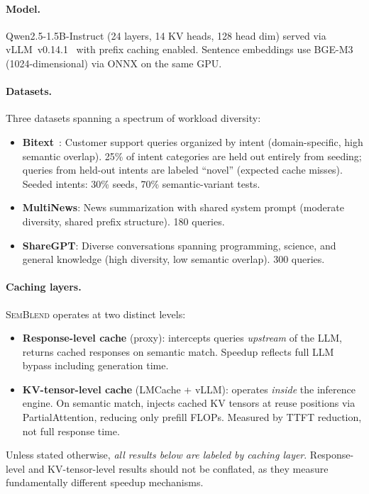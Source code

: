 \documentclass[11pt,twocolumn]{article}
\newcommand{\semblend}{\textsc{SemBlend}\xspace}
\begin{document}
\paragraph{Model.} Qwen2.5-1.5B-Instruct (24 layers, 14 KV heads, 128
head dim) served via vLLM~v0.14.1~\cite{vllm} with prefix caching
enabled. Sentence embeddings use BGE-M3 (1024-dimensional) via ONNX
on the same GPU.

\paragraph{Datasets.} Three datasets spanning a spectrum of workload
diversity:
\begin{itemize}[leftmargin=*,nosep]
\item \textbf{Bitext}~\cite{bitext}: Customer support queries organized
  by intent (domain-specific, high semantic overlap). 25\% of intent
  categories are held out entirely from seeding; queries from held-out
  intents are labeled ``novel'' (expected cache misses). Seeded intents:
  30\% seeds, 70\% semantic-variant tests.
\item \textbf{MultiNews}: News summarization with shared system
  prompt (moderate diversity, shared prefix structure). 180 queries.
\item \textbf{ShareGPT}: Diverse conversations spanning programming,
  science, and general knowledge (high diversity, low semantic overlap).
  300 queries.
\end{itemize}

\paragraph{Caching layers.} \semblend operates at two distinct levels:
\begin{itemize}[leftmargin=*,nosep]
\item \textbf{Response-level cache} (proxy): intercepts queries
  \emph{upstream} of the LLM, returns cached responses on semantic
  match. Speedup reflects full LLM bypass including generation time.
\item \textbf{KV-tensor-level cache} (LMCache + vLLM): operates
  \emph{inside} the inference engine. On semantic match, injects
  cached KV tensors at reuse positions via PartialAttention, reducing
  only prefill FLOPs. Measured by TTFT reduction, not full response
  time.
\end{itemize}
Unless stated otherwise, \emph{all results below are labeled by
caching layer}. Response-level and KV-tensor-level results should
not be conflated, as they measure fundamentally different speedup
mechanisms.
\end{document}
